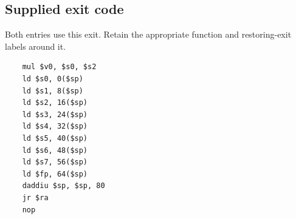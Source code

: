 \subsection*{Supplied exit code}
Both entries use this exit. Retain the appropriate function and restoring-exit labels around it.
\begin{verbatim}
    mul $v0, $s0, $s2
    ld $s0, 0($sp)
    ld $s1, 8($sp)
    ld $s2, 16($sp)
    ld $s3, 24($sp)
    ld $s4, 32($sp)
    ld $s5, 40($sp)
    ld $s6, 48($sp)
    ld $s7, 56($sp)
    ld $fp, 64($sp)
    daddiu $sp, $sp, 80
    jr $ra
    nop
\end{verbatim}
